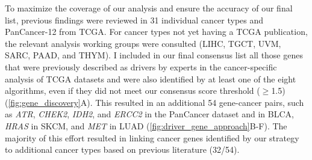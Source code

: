 To maximize the coverage of our analysis and ensure the accuracy of our final list, previous findings were reviewed in 31 individual cancer types and PanCancer-12 from TCGA. For cancer types not yet having a TCGA publication, the relevant analysis working groups were consulted (LIHC, TGCT, UVM, SARC, PAAD, and THYM). I included in our final consensus list all those genes that were previously described as drivers by experts in the cancer-specific analysis of TCGA datasets and were also identified by at least one of the eight algorithms, even if they did not meet our consensus score threshold ($\geq$1.5)(\autoref{fig:gene_discovery}A). This resulted in an additional 54 gene-cancer pairs, such as \textit{ATR}, \textit{CHEK2}, \textit{IDH2}, and \textit{ERCC2} in the PanCancer dataset and  in BLCA, \textit{HRAS} in SKCM, and \textit{MET} in LUAD (\autoref{fig:driver_gene_approach}B-F). The majority of this effort resulted in linking cancer genes identified by our strategy to additional cancer types based on previous literature (32/54).  

